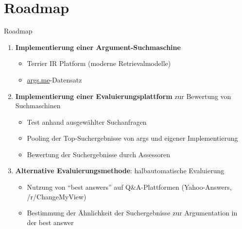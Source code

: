 \documentclass{beamer}
\begin{document}
	\section{Roadmap}
	\begin{frame}{Roadmap}
		\begin{enumerate}
			\item \textbf{Implementierung einer Argument-Suchmaschine}
			\begin{itemize}
				\item Terrier IR Platform (moderne Retrievalmodelle)
				\item \url{args.me}-Datensatz
			\end{itemize}
			\item \textbf{Implementierung einer Evaluierungsplattform} zur Bewertung von Suchmaschinen
			\begin{itemize}
				\item Test anhand ausgewählter Suchanfragen
				\item Pooling der Top-Suchergebnisse von args und eigener Implementierung
				\item Bewertung der Suchergebnisse durch Assessoren
			\end{itemize}
			\item \textbf{Alternative Evaluierungsmethode}: halbautomatische Evaluierung
			\begin{itemize}
				\item Nutzung von ``best answers'' auf Q\&A-Plattformen (Yahoo-Answers, /r/ChangeMyView)
				\item Bestimmung der Ähnlichkeit der Suchergebnisse zur Argumentation in der best answer
			\end{itemize}
		\end{enumerate}
	\end{frame}
\end{document}
